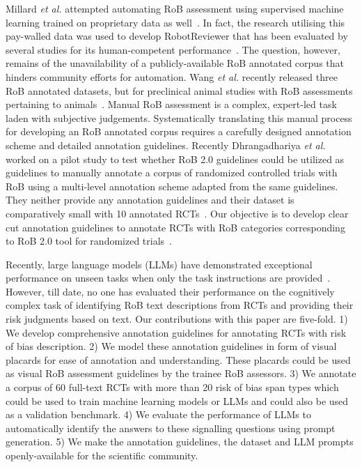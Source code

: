 \documentclass[sn-mathphys,Numbered]{sn-jnl}%
\theoremstyle{thmstyleone}%
\theoremstyle{thmstyletwo}%
\theoremstyle{thmstylethree}%
\begin{document}
Millard \textit{et al.} attempted automating RoB assessment using supervised machine learning trained on proprietary data as well~\cite{millard2016machine}.
In fact, the research utilising this pay-walled data was used to develop RobotReviewer that has been evaluated by several studies for its human-competent performance~\cite{marshall2016robotreviewer,soboczenski2019machine,vinkers2021methodological,jardim2022automating,hirt2021agreement}.
The question, however, remains of the unavailability of a publicly-available RoB annotated corpus that hinders community efforts for automation. 
Wang \textit{et al.} recently released three RoB annotated datasets, but for preclinical animal studies with RoB assessments pertaining to animals~\cite{wang2022risk}.
Manual RoB assessment is a complex, expert-led task laden with subjective judgements.
Systematically translating this manual process for developing an RoB annotated corpus requires a carefully designed annotation scheme and detailed annotation guidelines.
Recently Dhrangadhariya \textit{et al.} worked on a pilot study to test whether RoB 2.0 guidelines could be utilized as guidelines to manually annotate a corpus of randomized controlled trials with RoB using a multi-level annotation scheme adapted from the same guidelines.
They neither provide any annotation guidelines and their dataset is comparatively small with 10 annotated RCTs~\cite{dhrangadhariya2023first}.
Our objective is to develop clear cut annotation guidelines to annotate RCTs with RoB categories corresponding to RoB 2.0 tool for randomized trials~\cite{sterne2019rob}.



Recently, large language models (LLMs) have demonstrated exceptional performance on unseen tasks when only the task instructions are provided~\cite{chang2023survey}.
However, till date, no one has evaluated their performance on the cognitively complex task of identifying RoB text descriptions from RCTs and providing their risk judgments based on text.
Our contributions with this paper are five-fold. 
1) We develop comprehensive annotation guidelines for annotating RCTs with risk of bias description.
2) We model these annotation guidelines in form of visual placards for ease of annotation and understanding. These placards could be used as visual RoB assessment guidelines by the trainee RoB assessors.
3) We annotate a corpus of 60 full-text RCTs with more than 20 risk of bias span types which could be used to train machine learning models or LLMs and could also be used as a validation benchmark.
4) We evaluate the performance of LLMs to automatically identify the answers to these signalling questions using prompt generation.
5) We make the annotation guidelines, the dataset and LLM prompts openly-available for the scientific community.
%
%
%
\end{document}
